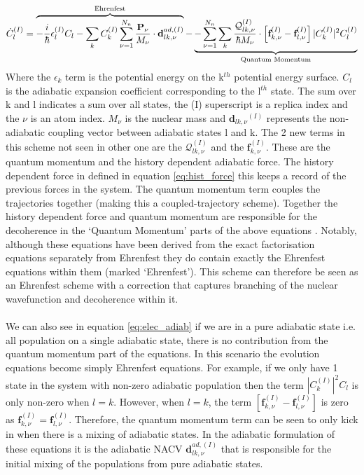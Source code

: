 \begin{dmath}
  \dot{C}_{l}^{(I)} =
  \overbrace{
    -\frac{i}{\hbar} \epsilon_l^{(I)} C_{l}
    - \sum_k C_k^{(I)} \sum_{\nu=1}^{N_n} \frac{\textbf{P}_{\nu}}{M_{\nu}} \cdot \textbf{d}_{lk, \nu}^{ad, (I)}
  }^{\text{Ehrenfest}} -
  \\
  \underbrace{
    - \sum_{\nu=1}^{N_n}\sum_{k} \frac{\mathcal{Q}_{lk, \nu}^{(I)}}{\hbar M_\nu} \cdot \left[ \textbf{f}_{k,\nu}^{(I)} - \textbf{f}_{l,\nu}^{(I)} \right] |C_{k}^{(I)}|^2 C_{l}^{(I)}
  }_{\text{Quantum Momentum}}
  \label{eq:elec_adiab}
\end{dmath}
Where the $\epsilon_k$ term is the potential energy on the k$^{th}$ potential energy surface. $C_l$ is the adiabatic expansion coefficient corresponding to the l$^{th}$ state. The sum over k and l indicates a sum over all states, the (I) superscript is a replica index and the $\nu$ is an atom index. $M_{\nu}$ is the nuclear mass and $\textbf{d}_{lk, \nu}{^(I)}$ represents the non-adiabatic coupling vector between adiabatic states l and k. The 2 new terms in this scheme not seen in other one are the $\mathcal{Q}_{lk, \nu}^{(I)}$ and the $\textbf{f}_{k, \nu}^{(I)}$. These are the quantum momentum and the history dependent adiabatic force. The history dependent force in defined in equation \eqref{eq:hist_force} this keeps a record of the previous forces in the system. The quantum momentum term couples the trajectories together (making this a coupled-trajectory scheme). Together the history dependent force and quantum momentum are responsible for the decoherence in the `Quantum Momentum' parts of the
above equations \cite{gossel_coupled-trajectory_2018}. Notably, although these equations have been derived from the exact factorisation equations separately from Ehrenfest they do contain exactly the Ehrenfest equations within them (marked `Ehrenfest'). This scheme can therefore be seen as an Ehrenfest scheme with a correction that captures branching of the nuclear wavefunction and decoherence within it.
\\\\
We can also see in equation \eqref{eq:elec_adiab} if we are in a pure adiabatic state i.e. all population on a single adiabatic state, there is no contribution from the quantum momentum part of the equations. In this scenario the evolution equations become simply Ehrenfest equations. For example, if we only have 1 state in the system with non-zero adiabatic population then the term $|C_{k}^{(I)}|^2 C_{l}$ is only non-zero when $l = k$. However, when $l = k$, the term $\left[ \textbf{f}_{k,\nu}^{(I)} - \textbf{f}_{l,\nu}^{(I)} \right]$ is zero as $\textbf{f}_{k,\nu}^{(I)} = \textbf{f}_{l,\nu}^{(I)}$.
Therefore, the quantum momentum term can be seen to only kick in when there is a mixing of adiabatic states. In the adiabatic formulation of these equations it is the adiabatic NACV $\textbf{d}_{lk, \nu}^{ad, (I)}$ that is responsible for the initial mixing of the populations from pure adiabatic states.


